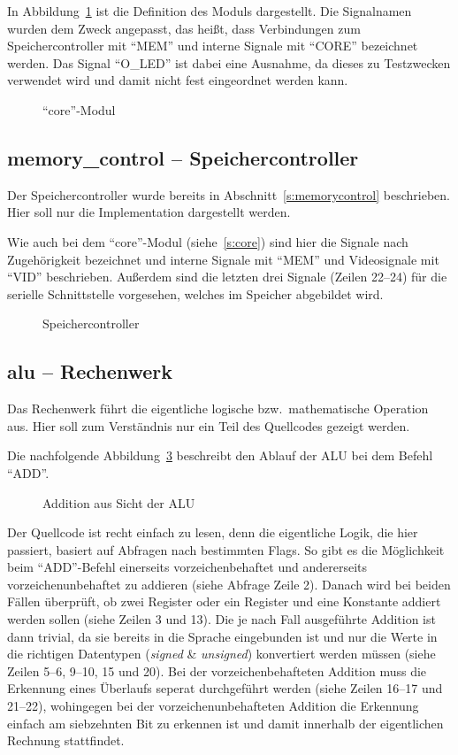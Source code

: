 In Abbildung~\ref{code:core} ist die Definition des Moduls dargestellt. Die
Signalnamen wurden dem Zweck angepasst, das heißt, dass Verbindungen zum
Speichercontroller mit "`MEM"' und interne Signale mit "`CORE"' bezeichnet werden.
Das Signal "`O\_LED"' ist dabei eine Ausnahme, da dieses zu Testzwecken verwendet
wird und damit nicht fest eingeordnet werden kann.
\begin{figure}[htb]

\caption{"`core"'-Modul}
\label{code:core}
\end{figure}
\pagebreak
\subsection{memory\_control -- Speichercontroller}
\label{s:memcontrol}
Der Speichercontroller wurde bereits in Abschnitt~\ref{s:memorycontrol}
beschrieben. Hier soll nur die Implementation dargestellt werden.

Wie auch bei dem "`core"'-Modul (siehe~\ref{s:core}) sind hier die Signale nach
Zugehörigkeit bezeichnet und interne Signale mit "`MEM"' und Videosignale mit
"`VID"' beschrieben. Außerdem sind die letzten drei Signale (Zeilen 22--24) für
die serielle Schnittstelle vorgesehen, welches im Speicher abgebildet wird.
\begin{figure}[htb]

\caption{Speichercontroller}
\label{code:mem_control}
\end{figure}
\pagebreak
\subsection{alu -- Rechenwerk}
Das Rechenwerk führt die eigentliche logische bzw.\ mathematische Operation aus.
Hier soll zum Verständnis nur ein Teil des Quellcodes gezeigt werden.

Die nachfolgende Abbildung~\ref{code:alu_add} beschreibt den Ablauf der \ac{ALU} bei dem Befehl
"`ADD"'.

\begin{figure}[htb]

\caption{Addition aus Sicht der ALU}
\label{code:alu_add}
\end{figure}
Der Quellcode ist recht einfach zu lesen, denn die eigentliche Logik, die hier
passiert, basiert auf Abfragen nach bestimmten Flags. So gibt es die Möglichkeit
beim "`ADD"'-Befehl einerseits vorzeichenbehaftet und andererseits
vorzeichenunbehaftet zu addieren (siehe Abfrage Zeile 2). Danach wird bei beiden
Fällen überprüft, ob zwei Register oder ein Register und eine Konstante addiert
werden sollen (siehe Zeilen 3 und 13). Die je nach Fall ausgeführte Addition ist
dann trivial, da sie bereits in die Sprache eingebunden ist und nur die Werte in
die richtigen Datentypen (\textit{signed} \& \textit{unsigned}) konvertiert
werden müssen (siehe Zeilen 5--6, 9--10, 15 und 20).  Bei der
vorzeichenbehafteten Addition muss die Erkennung eines Überlaufs seperat
durchgeführt werden (siehe Zeilen 16--17 und 21--22), wohingegen bei der
vorzeichenunbehafteten Addition die Erkennung einfach am siebzehnten Bit zu
erkennen ist und damit innerhalb der eigentlichen Rechnung stattfindet.
